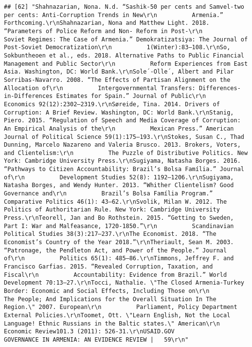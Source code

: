 \documentclass[
]{article}
\begin{document}
\begin{verbatim}
## [62] "Shahnazarian, Nona. N.d. “Sashik-50 per cents and Samvel-two per cents: Anti-Corruption Trends in New\r\n          Armenia.” Forthcoming.\r\nShahnazarian, Nona and Matthew Light. 2018. “Parameters of Police Reform and Non- Reform in Post-\r\n          Soviet Regimes: The Case of Armenia.” Demokratizatsiya: The Journal of Post-Soviet Democratization\r\n          1(Winter):83–108.\r\nSo, Sokbuntheoen et al., eds. 2018. Alternative Paths to Public Financial Management and Public Sector\r\n          Reform Experiences from East Asia. Washington, DC: World Bank.\r\nSole´-Olle´, Albert and Pilar Sorribas-Navarro. 2008. “The Effects of Partisan Alignment on the Allocation of\r\n          Intergovernmental Transfers: Differences-in-Differences Estimates for Spain.” Journal of Public\r\n          Economics 92(12):2302–2319.\r\nSøreide, Tina. 2014. Drivers of Corruption: A Brief Review. Washington, DC: World Bank.\r\nStanig, Piero. 2015. “Regulation of Speech and Media Coverage of Corruption: An Empirical Analysis of the\r\n          Mexican Press.” American Journal of Political Science 59(1):175–193.\r\nStokes, Susan C., Thad Dunning, Marcelo Nazareno and Valeria Brusco. 2013. Brokers, Voters, and Clientelism:\r\n          The Puzzle of Distributive Politics. New York: Cambridge University Press.\r\nSugiyama, Natasha Borges. 2016. “Pathways to Citizen Accountability: Brazil’s Bolsa Família.” Journal of\r\n          Development Studies 52(8): 1192–1206.\r\nSugiyama, Natasha Borges, and Wendy Hunter. 2013. “Whither Clientelism? Good Governance and\r\n          Brazil’s Bolsa Família Program.” Comparative Politics 46(1): 43–62.\r\nSvolik, Milan W. 2012. The Politics of Authoritarian Rule. New York: Cambridge University Press.\r\nTeorell, Jan and Bo Rothstein. 2015. “Getting to Sweden, Part I: War and Malfeasance, 1720-1850.”\r\n          Scandinavian Political Studies 38(3):217–237.\r\nThe Economist. 2018. “The Economist’s Country of the Year 2018.”\r\nTheriault, Sean M. 2003. “Patronage, the Pendleton Act, and Power of the People.” Journal of\r\n          Politics 65(1): 485–86.\r\nTimmons, Jeffrey F. and Francisco Garfias. 2015. “Revealed Corruption, Taxation, and Fiscal\r\n          Accountability: Evidence from Brazil.” World Development 70:13–27.\r\nTocci, Nathalie. \"The Closed Armenia-Turkey Border: Economic and Social Effects, Including Those on\r\n          The People; And Implications for the Overall Situation In The Region.\" 2007. European\r\n          Parliament, Policy Department External Policies.\r\nToomet, Ott. \"Learn English, Not the Local Language! Ethnic Russians in the Baltic states.\" American\r\n          Economic Review101.3 (2011): 526-31.\r\nUSAID.GOV                                                       GOVERNANCE IN ARMENIA: AN EVIDENCE REVIEW |   59\r\n"                                                                                                                                                                                                                                                                                                                                                                                                                                                                                                        
\end{verbatim}
\end{document}
